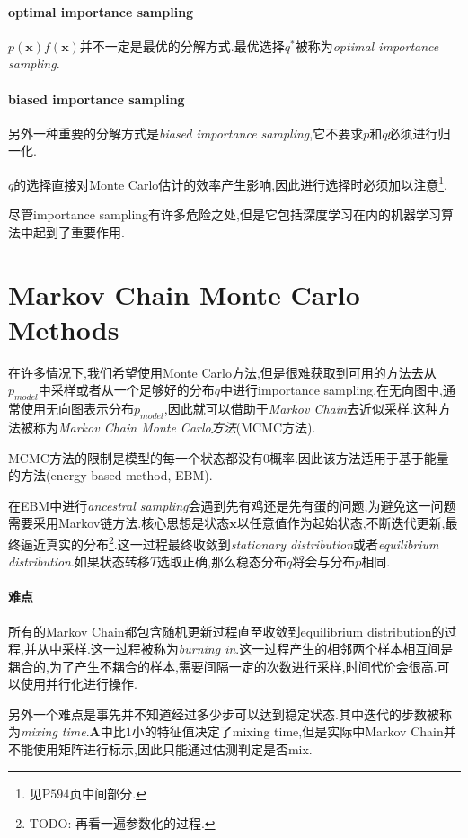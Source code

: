 \paragraph{optimal importance sampling}$p(\mathbf x)f(\mathbf x)$并不一定是最优的分解方式.最优选择$q^\ast$被称为\textit{optimal importance sampling}.

\paragraph{biased importance sampling}另外一种重要的分解方式是\textit{biased importance sampling},它不要求$p$和$q$必须进行归一化.

$q$的选择直接对Monte Carlo估计的效率产生影响,因此进行选择时必须加以注意\footnote{见P$594$页中间部分.}.

尽管importance sampling有许多危险之处,但是它包括深度学习在内的机器学习算法中起到了重要作用.

\section{Markov Chain Monte Carlo Methods}

在许多情况下,我们希望使用Monte Carlo方法,但是很难获取到可用的方法去从$p_{model}$中采样或者从一个足够好的分布$q$中进行importance sampling.在无向图中,通常使用无向图表示分布$p_{model}$,因此就可以借助于\textit{Markov Chain}去近似采样.这种方法被称为\textit{Markov Chain Monte Carlo方法}(MCMC方法).

MCMC方法的限制是模型的每一个状态都没有$0$概率.因此该方法适用于基于能量的方法(energy-based method, EBM).

在EBM中进行\textit{ancestral sampling}会遇到先有鸡还是先有蛋的问题,为避免这一问题需要采用Markov链方法.核心思想是状态$\mathbf x$以任意值作为起始状态,不断迭代更新,最终逼近真实的分布\footnote{TODO: 再看一遍参数化的过程.}.这一过程最终收敛到\textit{stationary distribution}或者\textit{equilibrium distribution}.如果状态转移$T$选取正确,那么稳态分布$q$将会与分布$p$相同.

\paragraph{难点} 所有的Markov Chain都包含随机更新过程直至收敛到equilibrium distribution的过程,并从中采样.这一过程被称为\textit{burning in}.这一过程产生的相邻两个样本相互间是耦合的,为了产生不耦合的样本,需要间隔一定的次数进行采样,时间代价会很高.可以使用并行化进行操作.

另外一个难点是事先并不知道经过多少步可以达到稳定状态.其中迭代的步数被称为\textit{mixing time}.$\mathbf A$中比$1$小的特征值决定了mixing time,但是实际中Markov Chain并不能使用矩阵进行标示,因此只能通过估测判定是否mix.

